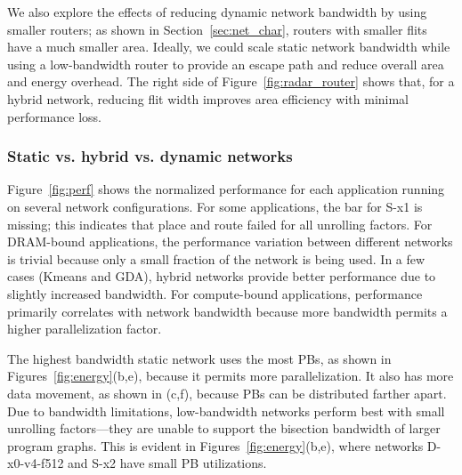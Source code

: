 We also explore the effects of reducing dynamic network bandwidth by using smaller routers;
as shown in Section~\ref{sec:net_char}, routers with smaller flits have a much smaller area.
Ideally, we could scale static network bandwidth while using a low-bandwidth router to provide an escape path and reduce overall area and energy overhead. 
The right side of Figure~\ref{fig:radar_router} shows that, for a hybrid network, reducing flit width improves area efficiency with minimal performance loss. 


\subsubsection{Static vs. hybrid vs. dynamic networks}

Figure~\ref{fig:perf} shows the normalized performance for each application running on several network configurations.
For some applications, the bar for S-x1 is missing; this indicates that place and route failed for all unrolling factors.
For DRAM-bound applications, the performance variation between different networks is trivial because only a small fraction of the network is being used. 
In a few cases (Kmeans and GDA), hybrid networks  provide better performance due to slightly increased bandwidth.
For compute-bound applications, performance primarily correlates with network bandwidth because more bandwidth permits a higher parallelization factor. 

The highest bandwidth static network uses the most PBs, as shown in Figures~\ref{fig:energy}(b,e), because it permits more parallelization. 
It also has more data movement, as shown in (c,f), because PBs can be distributed farther apart. 
Due to bandwidth limitations, low-bandwidth networks perform best with small unrolling factors---they are unable to support the bisection bandwidth of larger program graphs.
This is evident in Figures~\ref{fig:energy}(b,e), where networks D-x0-v4-f512 and S-x2 have small PB utilizations.

